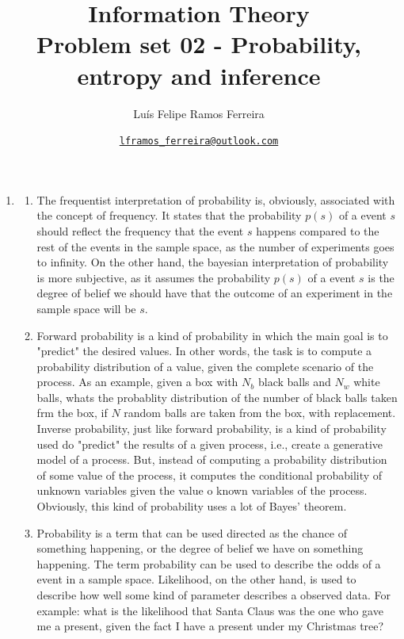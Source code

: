 \documentclass{article}
\title{Information Theory \\ \large Problem set 02 - Probability, entropy and inference}
\author{Luís Felipe Ramos Ferreira}
\date{\href{mailto:lframos\_ferreira@outlook.com}{\texttt{lframos\_ferreira@outlook.com}}
}
\begin{document}
\maketitle

\begin{enumerate}
	\item \begin{enumerate}
		      \item The frequentist interpretation of probability is, obviously, associated with the concept of frequency. It states that the probability \(p(s)\) of a event \(s\) should reflect the frequency that the event \(s\) happens compared to the rest of the events in the sample space, as the number of experiments goes to infinity. On the other hand, the bayesian interpretation of probability is more subjective, as it assumes the probability \(p(s)\) of a event \(s\) is the degree of belief we should have that the outcome of an experiment in the sample space will be \(s\).
		      \item Forward probability is a kind of probability in which the main goal is to "predict" the desired values. In other words, the task is to compute a probability distribution of a value, given the complete scenario of the process. As an example, given a box with \(N_b\) black balls and \(N_w\) white balls, whats the probablity distribution of the number of black balls taken frm the box, if \(N\) random balls are taken from the box, with replacement.
		            Inverse probability, just like forward probability, is a kind of probability used do "predict" the results of a given process, i.e., create a generative model of a process. But, instead of computing a probability distribution of some value of the process, it computes the conditional probability of unknown variables given the value o known variables of the process. Obviously, this kind of probability uses a lot of Bayes' theorem.
		      \item Probability is a term that can be used directed as the chance of something happening, or the degree of belief we have on something happening. The term probability can be used to describe the odds of a event in a sample space. Likelihood, on the other hand, is used to describe how well some kind of parameter describes a observed data. For example: what is the likelihood that Santa Claus was the one who gave me a present, given the fact I have a present under my Christmas tree?
	      \end{enumerate}


\end{enumerate}
\end{document}
